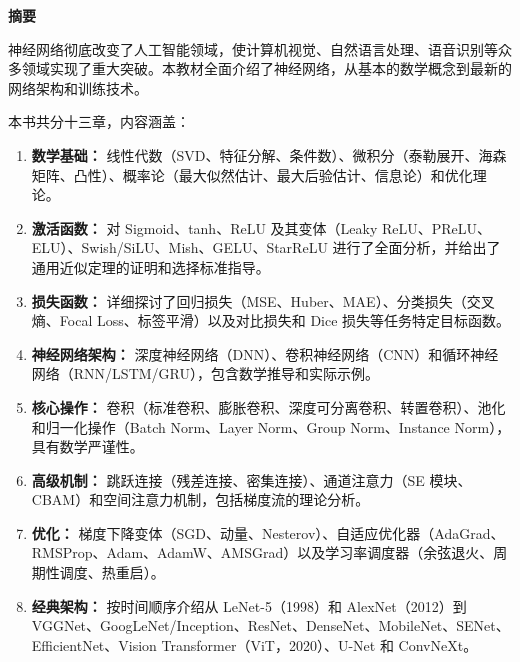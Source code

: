 \newpage
\thispagestyle{empty}

\begin{center}
    \Large\textbf{摘要}
\end{center}

\vspace{1cm}

神经网络彻底改变了人工智能领域，使计算机视觉、自然语言处理、语音识别等众多领域实现了重大突破。本教材全面介绍了神经网络，从基本的数学概念到最新的网络架构和训练技术。

本书共分十三章，内容涵盖：

\begin{enumerate}
    \item \textbf{数学基础：} 线性代数（SVD、特征分解、条件数）、微积分（泰勒展开、海森矩阵、凸性）、概率论（最大似然估计、最大后验估计、信息论）和优化理论。

    \item \textbf{激活函数：} 对 Sigmoid、tanh、ReLU 及其变体（Leaky ReLU、PReLU、ELU）、Swish/SiLU、Mish、GELU、StarReLU 进行了全面分析，并给出了通用近似定理的证明和选择标准指导。

    \item \textbf{损失函数：} 详细探讨了回归损失（MSE、Huber、MAE）、分类损失（交叉熵、Focal Loss、标签平滑）以及对比损失和 Dice 损失等任务特定目标函数。

    \item \textbf{神经网络架构：} 深度神经网络（DNN）、卷积神经网络（CNN）和循环神经网络（RNN/LSTM/GRU），包含数学推导和实际示例。

    \item \textbf{核心操作：} 卷积（标准卷积、膨胀卷积、深度可分离卷积、转置卷积）、池化和归一化操作（Batch Norm、Layer Norm、Group Norm、Instance Norm），具有数学严谨性。

    \item \textbf{高级机制：} 跳跃连接（残差连接、密集连接）、通道注意力（SE 模块、CBAM）和空间注意力机制，包括梯度流的理论分析。

    \item \textbf{优化：} 梯度下降变体（SGD、动量、Nesterov）、自适应优化器（AdaGrad、RMSProp、Adam、AdamW、AMSGrad）以及学习率调度器（余弦退火、周期性调度、热重启）。

    \item \textbf{经典架构：} 按时间顺序介绍从 LeNet-5（1998）和 AlexNet（2012）到 VGGNet、GoogLeNet/Inception、ResNet、DenseNet、MobileNet、SENet、EfficientNet、Vision Transformer（ViT，2020）、U-Net 和 ConvNeXt。


\end{enumerate}
